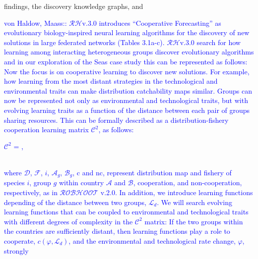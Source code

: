 \documentclass[11pt, a4paper]{article} %
\begin{document}
findings, the discovery knowledge graphs, and \textcolor{blue}{von
  Haldow, Maass:: $\mathcal{RH}$v.3.0 introduces ``Cooperative
  Forecasting'' as evolutionary biology-inspired neural learning
  algorithms for the discovery of new solutions in large federated
  networks (Tables 3.1a-c). $\mathcal{RH}$v.3.0 search for how
  learning among interacting heterogeneous groups discover
  evolutionary algorithms and in our exploration of the Seas case
  study this can be represented as follows: Now the focus is on
  cooperative learning to discover new solutions. For example, how
  learning from the most distant strategies in the technological and
  environmental traits can make distribution catchability maps
  similar. Groups can now be represented not only as environmental and
  technological traits, but with evolving learning traits as a
  function of the distance between each pair of groups sharing
  resources. This can be formally
  described as a distribution-fishery cooperation learning matrix $\mathcal{C}^2$, as follows: \vspace{0.2 in}\\
\begin{center}
  $\mathcal{C}^2$ = , \vspace{0.2 in}
\end{center}
\\
where $\mathcal{D}$, $\mathcal{F}$, $i$, $\mathcal{A}_{g}$,
$\mathcal{B}_{g}$, c and nc, represent distribution map and fishery of
species $i$, group $g$ within country $\mathcal{A}$ and $\mathcal{B}$,
cooperation, and non-cooperation, respectively, as in
$\mathcal{ROBHOOT}$ v.2.0. In addition, we introduce learning
functions depending of the distance between two groups,
$\mathcal{L}_{d}$. We will search evolving learning functions that can
be coupled to environmental and technological traits with different
degrees of complexity in the $\mathcal{C}^2$ matrix: If the two groups
within the countries are sufficiently distant, then learning functions
play a role to cooperate, $c(\varphi, \mathcal{L}_{d})$, and the
environmental and technological rate change, $\varphi$, strongly
}
\end{document}
